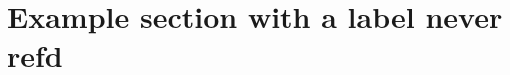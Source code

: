 \documentclass{grattan}
\begin{document}
\section{Example section with a label never refd}\label{sec:this-lab-not-refd}
\end{document}
